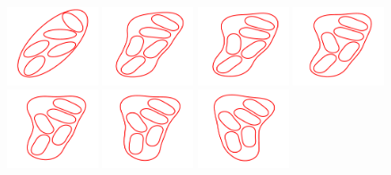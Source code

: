 \documentclass[prf,superscriptaddress,showpacs]{revtex4-1}
\begin{document}
\begin{figure}[htp]
  \centering
  \includegraphics[width=0.24\textwidth]{figs/relaxationManyVes_Snapshot01.pdf}
  \includegraphics[width=0.24\textwidth]{figs/relaxationManyVes_Snapshot02.pdf}
  \includegraphics[width=0.24\textwidth]{figs/relaxationManyVes_Snapshot03.pdf}
  \includegraphics[width=0.24\textwidth]{figs/relaxationManyVes_Snapshot04.pdf} \\
  \includegraphics[width=0.24\textwidth]{figs/relaxationManyVes_Snapshot05.pdf}
  \includegraphics[width=0.24\textwidth]{figs/relaxationManyVes_Snapshot06.pdf}
  \includegraphics[width=0.24\textwidth]{figs/relaxationManyVes_Snapshot07.pdf}

\end{figure}
\end{document}
